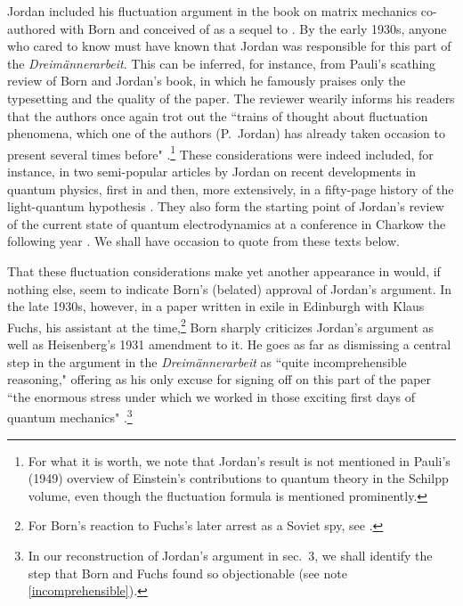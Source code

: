 \documentclass{elsart}
\begin{document}
Jordan included his fluctuation argument in the book on matrix mechanics co-authored with Born and conceived of as a sequel to \citep{Born 1925} \citep[sec.\ 73, pp.\ 392--400]{Born and Jordan 1930}. By the early 1930s, anyone who cared to know must have known that Jordan was responsible for this part of the {\it Dreim\"annerarbeit}. This can be inferred, for instance, from Pauli's scathing review of Born and Jordan's book, in which he famously praises only the typesetting and the quality of the paper. The reviewer wearily informs his readers that the authors once again trot out the ``trains of thought about fluctuation phenomena, which one of the authors (P.\ Jordan) has already taken occasion to present several times before" \citep{Pauli 1930}.\footnote{For what it is worth, we note that Jordan's result is not mentioned in Pauli's (1949) overview of Einstein's contributions to quantum theory in the Schilpp volume, even though the fluctuation formula is mentioned prominently.}
These considerations were indeed included, for instance, in two semi-popular articles by Jordan on recent developments in quantum physics, first in \citep[p.\ 642]{Jordan 1927b} and then, more extensively, in a fifty-page history of the light-quantum hypothesis \citep[sec.\ 13, pp.\ 192--196]{Jordan 1928}. They 
also form the starting point of Jordan's review of the current state of quantum electrodynamics at a conference in Charkow the following year \citep[pp.\ 700-702]{Jordan 1929}. We shall have occasion to quote from these texts below.

That these fluctuation considerations make yet another appearance in \citep{Born and Jordan 1930} would, if nothing else, seem to indicate Born's (belated) approval of Jordan's argument. In the late 1930s, however, in a paper written in exile in Edinburgh with  Klaus Fuchs, his assistant at the time,\footnote{For Born's reaction to Fuchs's later arrest as a Soviet spy, see \citep[p.\ 288]{Born 1978}.}
Born sharply criticizes Jordan's argument as well as Heisenberg's 1931 amendment to it. He goes as far as dismissing a central step in the argument in the {\it Dreim\"annerarbeit} as ``quite incomprehensible reasoning," offering as his  only excuse for signing off on this part of the paper ``the enormous stress under which we worked in those exciting first days of quantum mechanics" \citep[p.\ 263]{Born and Fuchs 1939a}.\footnote{\label{born complaint}In our reconstruction  of Jordan's argument in sec.\ 3, we shall identify the step that Born and Fuchs found so objectionable (see note \ref{incomprehensible}).} 
\end{document}
